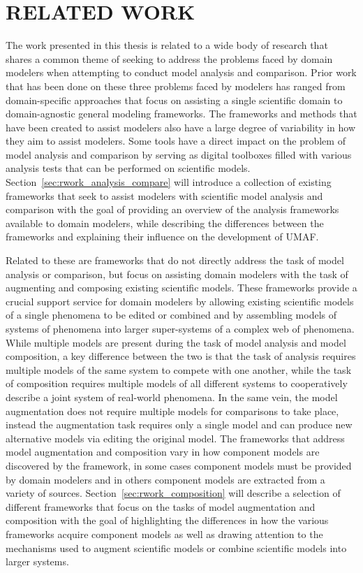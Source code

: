 \chapter{RELATED WORK\label{chapter:related_work}}
The work presented in this thesis is related to a wide body of research that shares a common theme of seeking to address the problems faced by domain modelers when attempting to conduct model analysis and comparison.
Prior work that has been done on these three problems faced by modelers has ranged from domain-specific approaches that focus on assisting a single scientific domain to domain-agnostic general modeling frameworks.
The frameworks and methods that have been created to assist modelers also have a large degree of variability in how they aim to assist modelers.
Some tools have a direct impact on the problem of model analysis and comparison by serving as digital toolboxes filled with various analysis tests that can be performed on scientific models.
Section~\ref{sec:rwork_analysis_compare} will introduce a collection of existing frameworks that seek to assist modelers with scientific model analysis and comparison with the goal of providing an overview of the analysis frameworks available to domain modelers, while describing the differences between the frameworks and explaining their influence on the development of UMAF.

Related to these are frameworks that do not directly address the task of model analysis or comparison, but focus on assisting domain modelers with the task of augmenting and composing existing scientific models.
These frameworks provide a crucial support service for domain modelers by allowing existing scientific models of a single phenomena to be edited or combined and by assembling models of systems of phenomena into larger super-systems of a complex web of phenomena.
While multiple models are present during the task of model analysis and model composition, a key difference between the two is that the task of analysis requires multiple models of the same system to compete with one another, while the task of composition requires multiple models of all different systems to cooperatively describe a joint system of real-world phenomena.
In the same vein, the model augmentation does not require multiple models for comparisons to take place, instead the augmentation task requires only a single model and can produce new alternative models via editing the original model.
The frameworks that address model augmentation and composition vary in how component models are discovered by the framework, in some cases component models must be provided by domain modelers and in others component models are extracted from a variety of sources.
Section~\ref{sec:rwork_composition} will describe a selection of different frameworks that focus on the tasks of model augmentation and composition with the goal of highlighting the differences in how the various frameworks acquire component models as well as drawing attention to the mechanisms used to augment scientific models or combine scientific models into larger systems.

